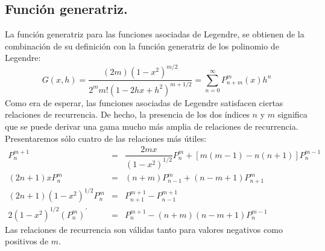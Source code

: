 \subsection*{Función generatriz.}
La función generatriz para las funciones asociadas de Legendre, se obtienen de la combinación de su definición con la función generatriz de los polinomio de Legendre:
\begin{equation}
G(x,h) = \dfrac{(2m)(1 - x^{2})^{m/2}}{2^{m} m! (1 - 2 hx + h^{2})^{m+1/2}} = \sum_{n=0}^{\infty} P_{n+m}^{m} (x) h^{n}
\label{eq:ecuacion_040}
\end{equation}
Como era de esperar, las funciones asociadas de Legendre satisfacen ciertas relaciones de recurrencia. De hecho, la presencia de los dos índices $n$ y $m$ significa que se puede derivar una gama mucho más amplia de relaciones de recurrencia. Presentaremos sólo cuatro de las relaciones más útiles:
\begin{eqnarray}
P_{n}^{m+1} &=& \dfrac{2mx}{(1-x^{2})^{1/2}} P_{n}^{m} + [m(m - 1) - n (n + 1)]P_{n}^{m-1} \\
(2n + 1)x P_{n}^{m} &=& (n + m) P_{n-1}^{m} + (n - m + 1) P_{n+1}^{m} \\
(2n + 1)(1 -  x^{2})^{1/2} P_{n}^{m} &=& P_{n+1}^{m+1} - P_{n-1}^{m+1} \\
2 (1 - x^{2})^{1/2} (P_{n}^{m})^{\prime} &=& P_{n}^{m+1} - (n + m)(n - m + 1) P_{n}^{m-1}
\end{eqnarray}
Las relaciones de recurrencia son válidas tanto para valores negativos como positivos de $m$.
